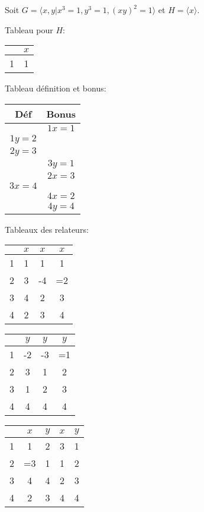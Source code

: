      \begin{ex}
       Soit $G = \langle x, y | x^3 = 1, y^3 = 1, (xy)^2 = 1 \rangle$ et $H = \langle x \rangle$.

       Tableau pour $H$:
       
       \begin{tabular}{c|c}
         & $x$\\
         \hline
         1 & 1
       \end{tabular}
      
       Tableau définition et bonus:
 
       \begin{tabular}{c|c}
         Déf & Bonus\\
         \hline
         & $1x = 1$\\
         \hline
         $1y = 2$ & \\
         \hline
         $2y = 3$ & \\
         \hline
         & $3y = 1$\\
         \hline
         & $2x = 3$\\
         \hline
         $3x = 4$ & \\
         \hline
          & $4x = 2$\\
         \hline
          & $4y = 4$
       \end{tabular}
       

       Tableaux des relateurs: 
       
       \begin{tabular}{c|c|c|c}
         & $x$ & $x$ & $x$ \\
         \hline
         1 & 1 & 1 & 1\\
         \hline
         2 & 3 & -4 & =2\\
         \hline
         3 & 4 & 2 & 3\\
         \hline
         4 & 2 & 3 & 4
       \end{tabular}

       \begin{tabular}{c|c|c|c}
          & $y$ & $y$ & $y$ \\
         \hline
         1 & -2 & -3 & =1\\
         \hline
         2 & 3 & 1 & 2\\
         \hline
         3 & 1 & 2 & 3\\
         \hline
         4 & 4 & 4 & 4
       \end{tabular}

       \begin{tabular}{c|c|c|c|c}
          & $x$ & $y$ & $x$ & $y$ \\
         \hline
         1 & 1 & 2 & 3 & 1\\
         \hline
         2 & =3 & 1 & 1 & 2\\
         \hline
         3 & 4 & 4 & 2 & 3\\
         \hline
         4 & 2 & 3 & 4 & 4
       \end{tabular}


\end{ex}
